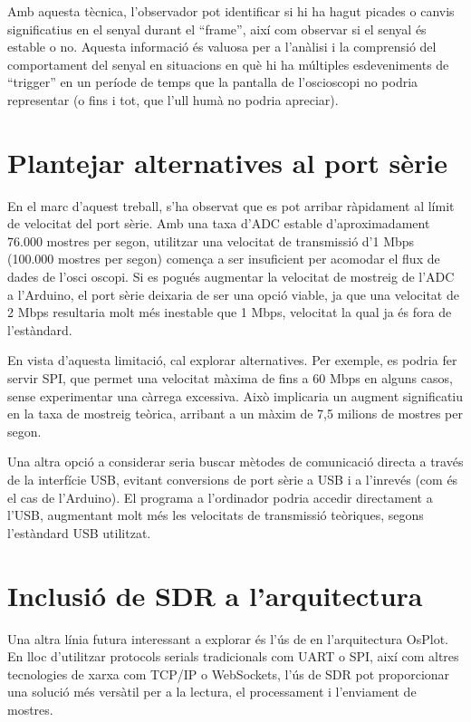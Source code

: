 \documentclass{tfgitic}[2023/06/30]
\begin{document}
Amb aquesta tècnica, l'observador pot identificar si hi ha hagut
picades o canvis significatius en el senyal durant el ``frame'', així
com observar si el senyal és estable o no. Aquesta informació és
valuosa per a l'anàlisi i la comprensió del comportament del senyal en
situacions en què hi ha múltiples esdeveniments de ``trigger'' en un
període de temps que la pantalla de l'osci\lgem oscopi no podria
representar (o fins i tot, que l'ull humà no podria apreciar).

\section{Plantejar alternatives al port sèrie}

En el marc d'aquest treball, s'ha observat que es pot arribar
ràpidament al límit de velocitat del port sèrie. Amb una taxa d'ADC
estable d'aproximadament 76.000 mostres per segon, utilitzar una
velocitat de transmissió d'1 Mbps (100.000 mostres per segon) comença
a ser insuficient per acomodar el flux de dades de l'osci\lgem
oscopi. Si es pogués augmentar la velocitat de mostreig de l'ADC a
l'Arduino, el port sèrie deixaria de ser una opció viable, ja que una
velocitat de 2 Mbps resultaria molt més inestable que 1 Mbps,
velocitat la qual ja és fora de l'estàndard.

En vista d'aquesta limitació, cal explorar alternatives. Per exemple,
es podria fer servir SPI, que permet una velocitat màxima de fins a 60
Mbps en alguns casos, sense experimentar una càrrega excessiva. Això
implicaria un augment significatiu en la taxa de mostreig teòrica,
arribant a un màxim de 7,5 milions de mostres per segon.

Una altra opció a considerar seria buscar mètodes de comunicació
directa a través de la interfície USB, evitant conversions de port
sèrie a USB i a l'inrevés (com és el cas de l'Arduino). El programa a
l'ordinador podria accedir directament a l'USB, augmentant molt més
les velocitats de transmissió teòriques, segons l'estàndard USB
utilitzat.

\section{Inclusió de SDR a l'arquitectura}

Una altra línia futura interessant a explorar és l'ús de \cite[Ràdio
  Definida per Software]{viqui-sdr} en l'arquitectura OsPlot. En lloc
d'utilitzar protocols serials tradicionals com UART o SPI, així com
altres tecnologies de xarxa com TCP/IP o WebSockets, l'ús de SDR pot
proporcionar una solució més versàtil per a la lectura, el
processament i l'enviament de mostres.
\end{document}
